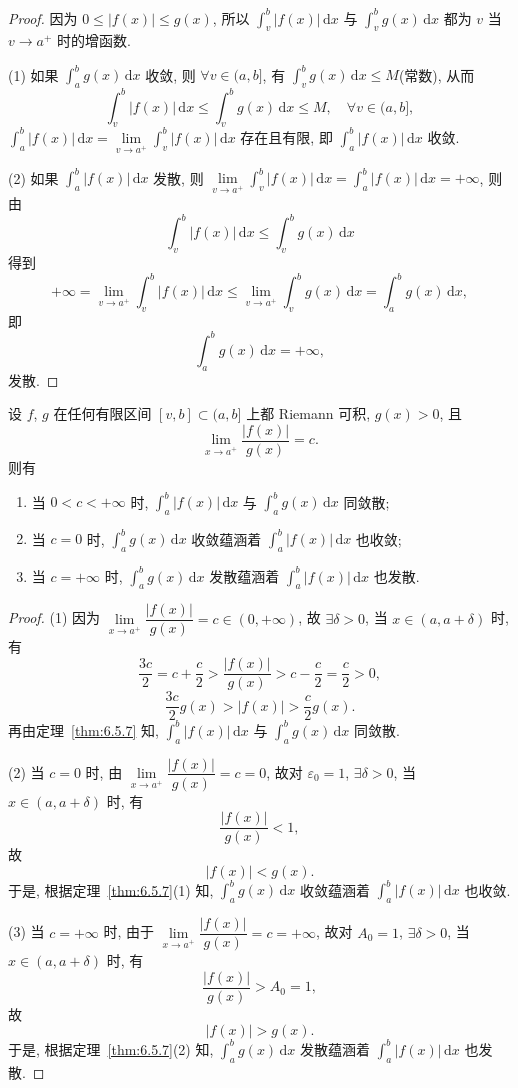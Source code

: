\begin{proof}
因为 $0\leqslant|f(x)|\leqslant g(x)$, 所以 $\int_{v}^{b}|f(x)|\,\mathrm{d}x$ 与 $\int_{v}^{b}g(x)\,\mathrm{d}x$ 都为 $v$ 当 $v\to a^{+}$ 时的增函数.

(1) 如果 $\int_{a}^{b}g(x)\,\mathrm{d}x$ 收敛, 则 $\forall v\in(a,b]$, 有 $\int_{v}^{b}g(x)\,\mathrm{d}x\leqslant M$(常数), 从而
\[
\int_{v}^{b}|f(x)|\,\mathrm{d}x\leqslant\int_{v}^{b}g(x)\,\mathrm{d}x\leqslant M,\quad\forall v\in(a,b],
\]
$\int_{a}^{b}|f(x)|\,\mathrm{d}x=\lim\limits_{v\to a^{+}}\int_{v}^{b}|f(x)|\,\mathrm{d}x$ 存在且有限, 即 $\int_{a}^{b}|f(x)|\,\mathrm{d}x$ 收敛.

(2) 如果 $\int_{a}^{b}|f(x)|\,\mathrm{d}x$ 发散, 则 $\lim\limits_{v\to a^{+}}\int_{v}^{b}|f(x)|\,\mathrm{d}x=\int_{a}^{b}|f(x)|\,\mathrm{d}x=+\infty$, 则由
\[
\int_{v}^{b}|f(x)|\,\mathrm{d}x\leqslant\int_{v}^{b}g(x)\,\mathrm{d}x
\]
得到
\[
+\infty=\lim_{v\to a^{+}}\int_{v}^{b}|f(x)|\,\mathrm{d}x\leqslant\lim_{v\to a^{+}}\int_{v}^{b}g(x)\,\mathrm{d}x=\int_{a}^{b}g(x)\,\mathrm{d}x,
\]
即
\[
\int_{a}^{b}g(x)\,\mathrm{d}x=+\infty,
\]
发散.
\end{proof}

\begin{theoremp}[瑕积分的比较判别法的极限形式]\label{thm:6.5.7p}
设 $f$, $g$ 在任何有限区间 $[v,b]\subset(a,b]$ 上都 Riemann 可积, $g(x)>0$, 且
\[
\lim_{x\to a^{+}}\frac{|f(x)|}{g(x)}=c.
\]
则有
\begin{enumerate}[label=(\arabic*)]
\item 当 $0<c<+\infty$ 时, $\int_{a}^{b}|f(x)|\,\mathrm{d}x$ 与 $\int_{a}^{b}g(x)\,\mathrm{d}x$ 同敛散;
\item 当 $c=0$ 时, $\int_{a}^{b}g(x)\,\mathrm{d}x$ 收敛蕴涵着 $\int_{a}^{b}|f(x)|\,\mathrm{d}x$ 也收敛;
\item 当 $c=+\infty$ 时, $\int_{a}^{b}g(x)\,\mathrm{d}x$ 发散蕴涵着 $\int_{a}^{b}|f(x)|\,\mathrm{d}x$ 也发散.
\end{enumerate}
\end{theoremp}

\begin{proof}
(1) 因为 $\lim\limits_{x\to a^{+}}\dfrac{|f(x)|}{g(x)}=c\in(0,+\infty)$, 故 $\exists\delta>0$, 当 $x\in(a,a+\delta)$ 时, 有
\[
\frac{3c}{2}=c+\frac{c}{2}>\frac{|f(x)|}{g(x)}>c-\frac{c}{2}=\frac{c}{2}>0,
\]
\[
\frac{3c}{2}g(x)>|f(x)|>\frac{c}{2}g(x).
\]
再由定理~\ref{thm:6.5.7} 知, $\int_{a}^{b}|f(x)|\,\mathrm{d}x$ 与 $\int_{a}^{b}g(x)\,\mathrm{d}x$ 同敛散.

(2) 当 $c=0$ 时, 由 $\lim\limits_{x\to a^{+}}\dfrac{|f(x)|}{g(x)}=c=0$, 故对 $\varepsilon_{0}=1$, $\exists\delta>0$, 当 $x\in(a,a+\delta)$ 时, 有
\[
\frac{|f(x)|}{g(x)}<1,
\]
故
\[
|f(x)|<g(x).
\]
于是, 根据定理~\ref{thm:6.5.7}(1) 知, $\int_{a}^{b}g(x)\,\mathrm{d}x$ 收敛蕴涵着 $\int_{a}^{b}|f(x)|\,\mathrm{d}x$ 也收敛.

(3) 当 $c=+\infty$ 时, 由于 $\lim\limits_{x\to a^{+}}\dfrac{|f(x)|}{g(x)}=c=+\infty$, 故对 $A_{0}=1$, $\exists\delta>0$, 当 $x\in(a,a+\delta)$ 时, 有
\[
\frac{|f(x)|}{g(x)}>A_{0}=1,
\]
故
\[
|f(x)|>g(x).
\]
于是, 根据定理~\ref{thm:6.5.7}(2) 知, $\int_{a}^{b}g(x)\,\mathrm{d}x$ 发散蕴涵着 $\int_{a}^{b}|f(x)|\,\mathrm{d}x$ 也发散.
\end{proof}

